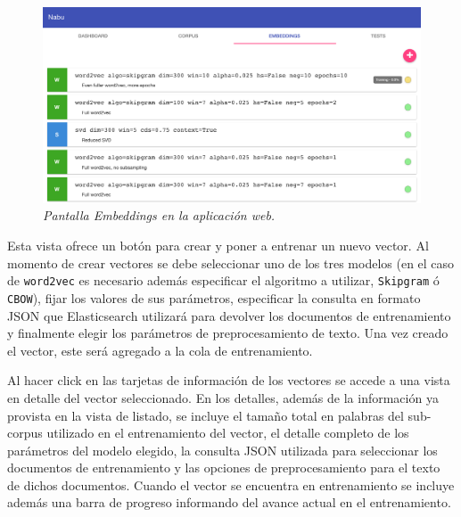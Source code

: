 \begin{figure}[h]
    \centering
    \includegraphics[width=\textwidth]{images/ui-nabu-embeddings}
    \caption{\textit{Pantalla Embeddings en la aplicación web.}}
    \label{fig:ui-nabu-embeddings}
\end{figure}

Esta vista ofrece un botón para crear y poner a entrenar un nuevo vector. Al momento de crear vectores se
debe seleccionar uno de los tres modelos (en el caso de \texttt{word2vec} es necesario además especificar
el algoritmo a utilizar, \texttt{Skipgram} ó \texttt{CBOW}), fijar los valores de sus parámetros,
especificar la consulta en formato JSON que Elasticsearch utilizará para devolver los documentos de
entrenamiento y finalmente elegir los parámetros de preprocesamiento de texto. Una vez creado el vector,
este será agregado a la cola de entrenamiento.

Al hacer click en las tarjetas de información de los vectores se accede a una vista en detalle del vector
seleccionado. En los detalles, además de la información ya provista en la vista de listado, se incluye el
tamaño total en palabras del sub-corpus utilizado en el entrenamiento del vector, el detalle completo de
los parámetros del modelo elegido, la consulta JSON utilizada para seleccionar los documentos de
entrenamiento y las opciones de preprocesamiento para el texto de dichos documentos. Cuando el vector se
encuentra en entrenamiento se incluye además una barra de progreso informando del avance actual en el
entrenamiento.

